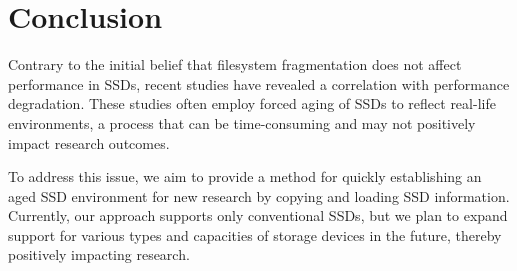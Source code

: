 \section{Conclusion} %
\label{s:conclusion}

Contrary to the initial belief that filesystem fragmentation does not affect performance in SSDs, recent studies have revealed a correlation with performance degradation. 
These studies often employ forced aging of SSDs to reflect real-life environments, a process that can be time-consuming and may not positively impact research outcomes.

To address this issue, we aim to provide a method for quickly establishing an aged SSD environment for new research by copying and loading SSD information. 
Currently, our approach supports only conventional SSDs, but we plan to expand support for various types and capacities of storage devices in the future, thereby positively impacting research.

